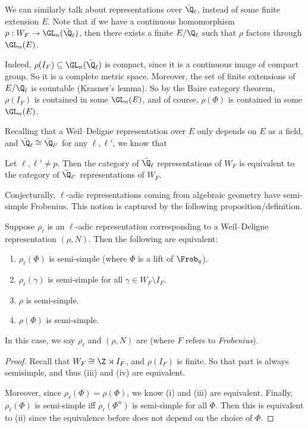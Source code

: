 \documentclass[a4paper]{article}
\begin{document}
We can similarly talk about representations over $\bar{\Q}_\ell$, instead of some finite extension $E$. Note that if we have a continuous homomorphism $\rho: W_F \to \GL_n(\bar{\Q}_\ell)$, then there exists a finite $E/\Q_\ell$ such that $\rho$ factors through $\GL_n(E)$.

Indeed, $\rho(I_F) \subseteq \GL_n(\bar{\Q}_\ell)$ is compact, since it is a continuous image of compact group. So it is a complete metric space. Moreover, the set of finite extensions of $E/\Q_\ell$ is countable (Krasner's lemma). So by the Baire category theorem, $\rho(I_F)$ is contained in some $\GL_n(E)$, and of course, $\rho(\Phi)$ is contained in some $\GL_n(E)$.

Recalling that a Weil--Deligne representation over $E$ only depends on $E$ as a field, and $\bar{\Q}_\ell \cong \bar{\Q}_{\ell'}$ for any $\ell, \ell'$, we know that
\begin{thm}
  Let $\ell, \ell' \not= p$. Then the category of $\bar{\Q}_\ell$ representations of $W_F$ is equivalent to the category of $\bar{\Q}_{\ell'}$ representations of $W_F$.
\end{thm}

Conjecturally, $\ell$-adic representations coming from algebraic geometry have semi-simple Frobenius. This notion is captured by the following proposition/definition.
\begin{prop}
  Suppose $\rho_\ell$ is an $\ell$-adic representation corresponding to a Weil--Deligne representation $(\rho, N)$. Then the following are equivalent:
  \begin{enumerate}
    \item $\rho_\ell(\Phi)$ is semi-simple (where $\Phi$ is a lift of $\Frob_q$).
    \item $\rho_\ell(\gamma)$ is semi-simple for all $\gamma \in W_F \setminus I_F$.
    \item $\rho$ is semi-simple.
    \item $\rho(\Phi)$ is semi-simple.
  \end{enumerate}
  In this case, we say $\rho_\ell$ and $(\rho, N)$ are  (where $F$ refers to \emph{Frobenius}).
\end{prop}
\begin{proof}
  Recall that $W_F \cong \Z \rtimes I_F$, and $\rho(I_F)$ is finite. So that part is always semisimple, and thus (iii) and (iv) are equivalent.

  Moreover, since $\rho_\ell(\Phi) = \rho(\Phi)$, we know (i) and (iii) are equivalent. Finally, $\rho_\ell(\Phi)$ is semi-simple iff $\rho_\ell(\Phi^n)$ is semi-simple for all $\Phi$. Then this is equivalent to (ii) since the equivalence before does not depend on the choice of $\Phi$.
\end{proof}
\end{document}
